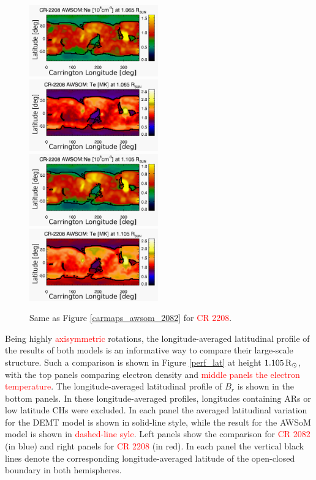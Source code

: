\documentclass[namedreferences]{solarphysics}
\def\edit#1{\textcolor{Red}{#1}}
\newcommand{\mrsun}{{\rm R_\odot}}
\begin{document}
\begin{article}
\begin{figure}[h!]
\begin{center}
\includegraphics[width=0.495\textwidth]{map_Ne_awsom_2208_185_short_1065_Rsun2.pdf}
\includegraphics[width=0.495\textwidth]{map_Te_awsom_2208_185_short_1065_Rsun2.pdf}
\includegraphics[width=0.495\textwidth]{map_Ne_awsom_2208_185_short_1105_Rsun2.pdf}
\includegraphics[width=0.495\textwidth]{map_Te_awsom_2208_185_short_1105_Rsun2.pdf}
\caption{Same as Figure \ref{carmaps_awsom_2082} for \edit{CR 2208}.}
\label{carmaps_awsom_2208}
\end{center}
\end{figure}

{Being highly \edit{axisymmetric} rotations, the longitude-averaged latitudinal {profile} of the results of both models is an informative way to compare their large-scale structure. {Such a comparison} is shown in Figure \ref{perf_lat} at height $1.105\,\mrsun$, {with the top} panels comparing electron density and \edit{middle panels the electron temperature}. {The longitude-averaged latitudinal profile of $B_r$ is shown in the bottom panels.} In these longitude-averaged profiles, longitudes containing ARs or low latitude CHs were excluded. In each panel the averaged latitudinal variation for the DEMT model is shown in solid-line style, while the result for the AWSoM model is shown in \edit{dashed-line syle}. Left panels show the comparison for \edit{CR 2082} (in blue) and right panels for \edit{CR 2208} (in red). In each panel the vertical black lines denote the corresponding longitude-averaged latitude of the open-closed boundary in both hemispheres.}


\end{article}
\end{document}
